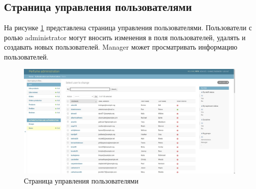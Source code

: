 \subsection{Страница управления пользователями}

На рисунке \ref{site_admin_users} представлена страница управления пользователями. Пользователи с ролью administrator могут вносить изменения в поля пользователей, удалять и создавать новых пользователей. Manager может просматривать информацию пользователей.

\captionsetup{singlelinecheck = false, justification=centering}
\begin{figure}[h!]
	\begin{center}
		\includegraphics[scale=0.45]{assets/site_admin_users.jpg}
	\end{center}
	\caption{Страница управления пользователями}
	\label{site_admin_users}
\end{figure}